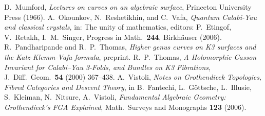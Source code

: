 \documentclass{amsart}
\theoremstyle{definition}
\begin{document}
\begin{thebibliography}{BOPY}
 D.~Mumford, \textit{Lectures on curves on an algebraic surface}, Princeton University Press (1966).
 A.~Okounkov, N.~Reshetikhin, and C.~Vafa, \textit{Quantum Calabi-Yau and classical crystals}, in: The unity of mathematics, editors: P.~Etingof, V.~Retakh, I.~M.~Singer, Progress in Math.~\textbf{244}, Birkh\"auser (2006).
 R.~Pandharipande and R.~P.~Thomas, \textit{Higher genus curves on K3 surfaces and the Katz-Klemm-Vafa formula}, preprint.
 R.~P.~Thomas, \textit{A Holomorphic Casson Invariant for Calabi--Yau 3-Folds, and Bundles on K3 Fibrations}, J.~Diff.~Geom.~\textbf{54} (2000) 367--438.
 A.~Vistoli, \textit{Notes on Grothendieck Topologies, Fibred Categories and Descent Theory}, in B.~Fantechi, L.~G\"ottsche, L.~Illusie, S.~Kleiman, N.~Nitsure, A.~Vistoli, \textit{Fundamental Algebraic Geometry: Grothendieck's FGA Explained}, Math.~Surveys and Monographs \textbf{123} (2006).
\end{thebibliography}
\end{document}
